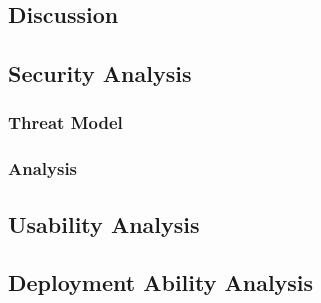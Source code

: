 \begin{CJK}{Bg5}{bsmi}


\chapter{Discussion}

\section{Security Analysis}

\begin{comment}
This is the most important part of an authentication system.
We have to define our threat model before we start to analyze.
There are 4 components in the scheme I proposed.
\end{comment}

\subsection{Threat Model}

\subsection{Analysis}

\section{Usability Analysis}

\begin{comment}
The usability can not be neglected when researchers trying to design a system.
Usability is a subjective perception, it may be different from person to person.
The following paragragh states the criterias I used to estimate the usability of a system.
\end{comment}

\section{Deployment Ability Analysis}

\begin{comment}
The deployment ability is also an important thing which is need to be considered, especially in designing an authentication system.
A system with high usability means it is friendly to users; a system with high deployment ability means it is friendly to the system provider or, more precise, the developers.
The following paragraph states the criterias I used to estimate a system's deployment ability. 
\end{comment}


\end{CJK}